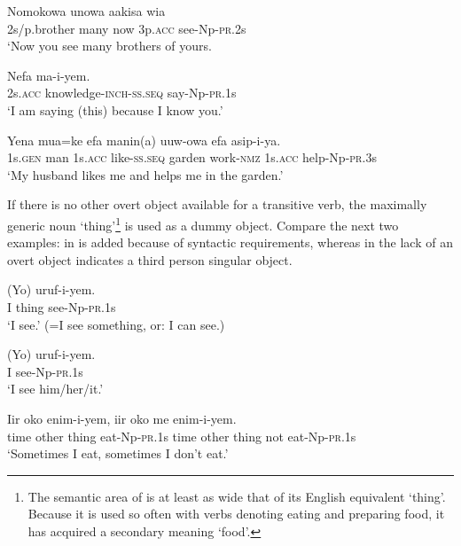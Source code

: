 \ea%
\label{ex:3:x297}
\gll Nomokowa unowa aakisa wia  \\
2s/p.brother many now 3p.\textsc{acc} see-Np-\textsc{pr}.2s \\
\glt`Now you see many brothers of yours.
\z

\ea%
\label{ex:3:x298}
\gll Nefa  ma-i-yem. \\
2s.\textsc{acc} knowledge-\textsc{inch}-\textsc{ss}.\textsc{seq} say-Np-\textsc{pr}.1s \\
\glt`I am saying (this) because I know you.'
\z

\ea%
\label{ex:3:x299}
\gll Yena mua=ke efa  manin(a) uuw-owa efa asip-i-ya.\\
1s.\textsc{gen} man 1s.\textsc{acc} like-\textsc{ss}.\textsc{seq} garden work-\textsc{nmz} 1s.\textsc{acc} help-Np-\textsc{pr}.3s\\
\glt`My husband likes me and helps me in the garden.'
\z

If there is no other overt object available for a transitive verb, the maximally generic noun  `thing'\footnote{The semantic area of  is at least as wide that of its English equivalent `thing'. Because it is used so often with verbs denoting eating and preparing food, it has acquired a secondary meaning `food'.} is used as a dummy object. Compare the next two examples: in   is added because of syntactic requirements, whereas in  the lack of an overt object indicates a third person singular object.

\ea%
\label{ex:3:x300}
\gll (Yo)  uruf-i-yem. \\
I thing see-Np-\textsc{pr}.1s \\
\glt`I see.' (=I see something, or: I can see.) 
\z

\ea%
\label{ex:3:x301}
\gll (Yo) uruf-i-yem. \\
I see-Np-\textsc{pr}.1s \\
\glt`I see him/her/it.'
\z

\ea%
\label{ex:3:x1825}
\gll Iir oko  enim-i-yem, iir oko  me enim-i-yem. \\
time other thing eat-Np-\textsc{pr}.1s time other thing not eat-Np-\textsc{pr}.1s\\
\glt`Sometimes I eat, sometimes I don't eat.'
\z

